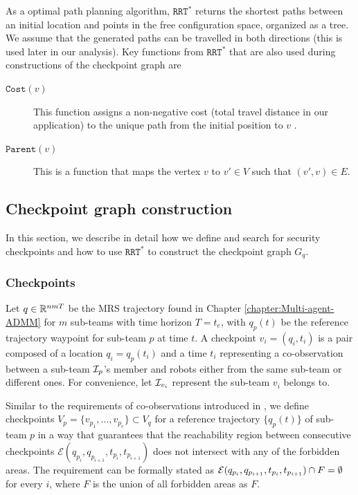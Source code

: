 \documentclass[journal]{IEEEtran}  %
\newcommand{\rrtstar}{$\texttt{RRT}^\texttt{*}$}
\begin{document}
As a optimal path planning algorithm, \rrtstar{} returns the shortest paths between an initial location and points in the free configuration space, organized as a tree. We assume that the generated paths can be travelled in both directions (this is used later in our analysis). 
Key functions from \rrtstar{} that are also used during constructions of the checkpoint graph are
\begin{description}
\item[$\texttt{Cost}(v)$] This function assigns a non-negative cost (total travel distance in our application) to the unique path from the initial position to $v$ . 
\item[$\texttt{Parent}(v)$] This is a function that maps the vertex $v$ to $v'\in V$ such that $(v',v)\in E$.
\end{description}

\subsection{Checkpoint graph construction}

In this section, we describe in detail how we define and search for security checkpoints and how to use \rrtstar{} to construct the checkpoint graph $G_{q}$.

\subsubsection{Checkpoints}\label{sec:security-checkpoint}
Let $q\in\mathbb{R}^{nmT}{}$ be the MRS trajectory found in Chapter \ref{chapter:Multi-agent-ADMM} for $m$ sub-teams with time horizon $T=t_{e}$, with $q_{p}(t)$ be the reference trajectory waypoint for sub-team $p$ at time $t$. A checkpoint $v_i=(q_{i},t_{i})$ is a pair composed of a location $q_{i}=q_{p}(t_{i})$ and a time $t_{i}$ representing a co-observation between a sub-team $\mathcal{I}_p$'s member and robots either from the same sub-team or different ones. For convenience, let $\mathcal{I}_{v_{i}}$ represent the sub-team $v_{i}$ belongs to. 

Similar to the requirements of co-observations introduced in  ,  {we define checkpoints $V_{p}=\{ v_{p_{1}}, \dots ,v_{p_{e}}\} \subset V_{q}$ for a reference trajectory $\{q_{p}(t)\}$ of sub-team $p$ in a way that guarantees that the reachability region between consecutive checkpoints $\mathcal{E}(q_{p_{i}}, q_{p_{i+1}}, t_{p_{i}},t_{p_{i+1}})$ does not intersect with any of the forbidden areas.}  The requirement can be formally stated as $\mathcal{E}(q_{p_{i}}, q_{p_{i+1}}, t_{p_{i}},t_{p_{i+1}}) \cap F = \emptyset$ for every $i$, where $F$ is the union of all forbidden areas as $F$. 
\end{document}
